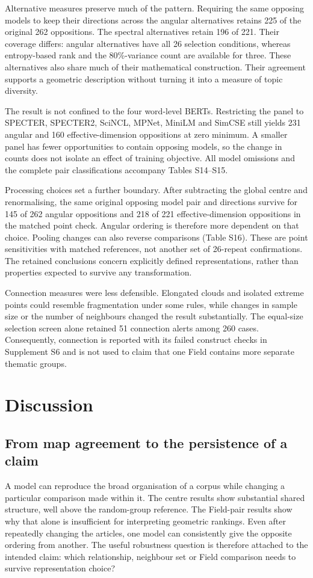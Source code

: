 \documentclass[12pt]{article}
\begin{document}
Alternative measures preserve much of the pattern. Requiring the same opposing models to keep their directions across the angular alternatives retains 225 of the original 262 oppositions. The spectral alternatives retain 196 of 221. Their coverage differs: angular alternatives have all 26 selection conditions, whereas entropy-based rank and the 80\%-variance count are available for three. These alternatives also share much of their mathematical construction. Their agreement supports a geometric description without turning it into a measure of topic diversity.

The result is not confined to the four word-level BERTs. Restricting the panel to SPECTER, SPECTER2, SciNCL, MPNet, MiniLM and SimCSE still yields 231 angular and 160 effective-dimension oppositions at zero minimum. A smaller panel has fewer opportunities to contain opposing models, so the change in counts does not isolate an effect of training objective. All model omissions and the complete pair classifications accompany Tables S14--S15.

Processing choices set a further boundary. After subtracting the global centre and renormalising, the same original opposing model pair and directions survive for 145 of 262 angular oppositions and 218 of 221 effective-dimension oppositions in the matched point check. Angular ordering is therefore more dependent on that choice. Pooling changes can also reverse comparisons (Table S16). These are point sensitivities with matched references, not another set of 26-repeat confirmations. The retained conclusions concern explicitly defined representations, rather than properties expected to survive any transformation.

Connection measures were less defensible. Elongated clouds and isolated extreme points could resemble fragmentation under some rules, while changes in sample size or the number of neighbours changed the result substantially. The equal-size selection screen alone retained 51 connection alerts among 260 cases. Consequently, connection is reported with its failed construct checks in Supplement S6 and is not used to claim that one Field contains more separate thematic groups.

\section{Discussion}
\subsection{From map agreement to the persistence of a claim}
A model can reproduce the broad organisation of a corpus while changing a particular comparison made within it. The centre results show substantial shared structure, well above the random-group reference. The Field-pair results show why that alone is insufficient for interpreting geometric rankings. Even after repeatedly changing the articles, one model can consistently give the opposite ordering from another. The useful robustness question is therefore attached to the intended claim: which relationship, neighbour set or Field comparison needs to survive representation choice?
\end{document}
